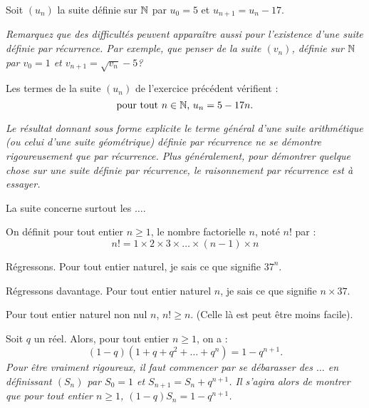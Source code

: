 \documentclass[a4paper,11pt,DIV14,BCOR0mm]{scrartcl}
\begin{document}
\begin{exercice}[*]
 Soit $(u_n)$ la suite définie sur $\mathbb{N}$ par $u_0=5$ et $u_{n+1}=u_n-17$.


\emph{Remarquez que des difficultés peuvent apparaître aussi pour l'existence d'une suite \og définie\fg{} par récurrence. Par exemple,
que penser de la suite $(v_n)$, \og définie\fg{} sur $\mathbb{N}$ par $v_0=1$ et $v_{n+1}=\sqrt{v_n}-5$?}
\end{exercice}

\begin{exercice}[*]
 Les termes de la suite $(u_n)$ de l'exercice précédent vérifient :\[\text{pour tout $n\in\mathbb{N}$, $u_n=5-17n$.}\]

\emph{Le résultat donnant sous forme explicite le terme général d'une suite arithmétique (ou celui d'une suite géométrique)
définie par récurrence ne se démontre rigoureusement que par récurrence.
Plus généralement, pour démontrer quelque chose sur une suite définie par récurrence, le raisonnement par récurrence est à essayer.}
\end{exercice}

La suite concerne surtout les \og $\dots$\fg.

\begin{exercice}
 On définit pour tout entier $n\geq 1$, le nombre factorielle $n$, noté $n!$ par :
\[n!=1\times2\times3\times\ldots\times(n-1)\times n\]
\end{exercice}

\begin{exercice}[*]
 Régressons. Pour tout entier naturel, je sais ce que signifie $37^n$.
\end{exercice}

\begin{exercice}[*]
 Régressons davantage. Pour tout entier naturel $n$, je sais ce que signifie $n\times 37$.
\end{exercice}


\begin{exercice}[*?]
 Pour tout entier naturel non nul $n$, $n!\geq n$. (Celle là est peut être moins facile).
\end{exercice}


\begin{exercice}
 Soit $q$ un réel. Alors, pour tout entier $n\geq1$, on a :
\[
 (1-q)(1+q+q^2+\dots+q^n)=1-q^{n+1}.
\]
 \emph{Pour être vraiment rigoureux, il faut commencer par se débarasser des $\dots$ en définissant $(S_n)$ par $S_0=1$ et $S_{n+1}=S_n+q^{n+1}$.
Il s'agira alors de montrer que pour tout entier $n\geq1$, $(1-q)S_n=1-q^{n+1}$.}
\end{exercice}
\end{document}
